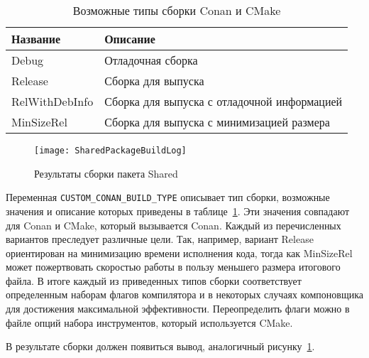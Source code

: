 \begin{table}[ht]
    \caption{Возможные типы сборки Conan и CMake}
    \label{table:manual:buildTypes}
    \begin{tabular}{| >{\raggedright}m{}
                    | >{\raggedright\arraybackslash}m{}|}
        \hline
        \centering Название & \centering\arraybackslash Описание \\

        \hline
        Debug &
        Отладочная сборка
        \\

        \hline
        Release &
        Сборка для выпуска
        \\

        \hline
        RelWithDebInfo &
        Сборка для выпуска с отладочной информацией
        \\

        \hline
        MinSizeRel &
        Сборка для выпуска с минимизацией размера
        \\

        \hline
    \end{tabular}
\end{table}

\fixTableSectionSpace

\begin{figure}[ht]
    \centering
    \texttt{[image: SharedPackageBuildLog]}
    \caption{Результаты сборки пакета Shared}
    \label{pic::manual::sharedPkgBuild}
\end{figure}

Переменная \lstinline{CUSTOM_CONAN_BUILD_TYPE} описывает тип сборки, возможные
значения и описание которых приведены в таблице~\ref{table:manual:buildTypes}.
Эти значения совпадают для Conan и CMake, который вызывается
Conan. Каждый из перечисленных вариантов преследует различные цели.
Так, например, вариант Release ориентирован на минимизацию времени исполнения кода,
тогда как MinSizeRel может пожертвовать скоростью работы в пользу меньшего
размера итогового файла.
В итоге каждый из приведенных типов сборки соответствует определенным наборам флагов
компилятора и в некоторых случаях компоновщика для достижения максимальной
эффективности.
Переопределить флаги можно в файле опций набора инструментов, который
используется CMake.

В результате сборки должен появиться вывод, аналогичный
рисунку~\ref{pic::manual::sharedPkgBuild}.

